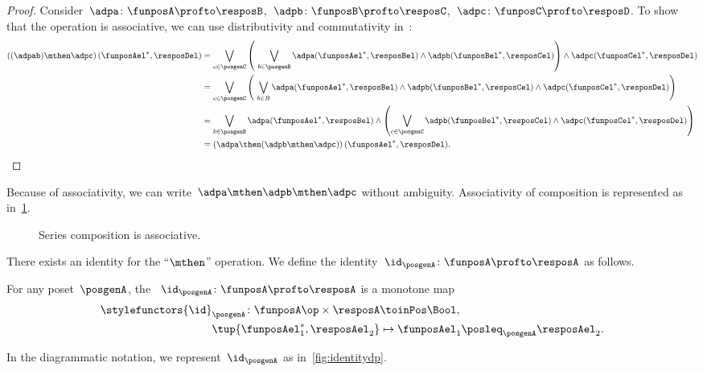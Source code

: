 \begin{proof}
  Consider~$\adpa\colon \funposA\profto \resposB$,~$\adpb\colon \funposB \profto \resposC$,~$\adpc\colon \funposC\profto \resposD$.
  To show that the operation is associative, we can use distributivity and commutativity in~\Bool:
%
  \begin{equation}
    \label{eq:dp_associativity}
    \begin{aligned}
      \left((\adpab) \mthen \adpc\right) (\funposAel^*,\resposDel)
      &= \bigvee_{c \in \posgenC} \left (\ \bigvee_{b\in \posgenB} \adpa(\funposAel^*,\resposBel) \wedge \adpb(\funposBel^*,\resposCel) \right )  \wedge  \adpc (\funposCel^*, \resposDel) \\
      &= \bigvee_{c \in \posgenC} \left (\ \bigvee_{b\in B } \adpa(\funposAel^*,\resposBel)
      \wedge \adpb(\funposBel^*,\resposCel) \wedge \adpc (\funposCel^*, \resposDel)
      \right ) \\
      &= \bigvee_{b \in \posgenB } \adpa(\funposAel^*,\resposBel) \wedge \left ( \bigvee_{c\in \posgenC} \adpb(\funposBel^*,\resposCel) \wedge \adpc (\funposCel^*, \resposDel) \right ) \\
      &= \left(\adpa \then (\adpb \mthen \adpc )\right) (\funposAel^*, \resposDel).
    \end{aligned}
  \end{equation}
%
\end{proof}

Because of associativity, we can write~$\adpa\mthen \adpb\mthen \adpc$ without ambiguity.
Associativity of composition is represented as in~\cref{fig:compositionassociativity}.

\begin{figure}[h!]
  \begin{center}
  \end{center}
  \caption{Series composition is associative. \label{fig:compositionassociativity}}
\end{figure}

There exists an identity for the ``$\mthen$'' operation.
We define the identity~$\id_\posgenA \colon \funposA \profto \resposA$ as follows.

\begin{definition}
  \label{def:dp-identity}
  For any poset~$\posgenA$, the \emph{}~$\id_\posgenA \colon \funposA \profto \resposA$ is a monotone map
  \begin{equation}
    \begin{aligned}
      \stylefunctors{\id}_\posgenA \colon \funposA\op \times \resposA & \toinPos   \Bool, \label{eq:identity}\\
      \tup{\funposAel_1^*, \resposAel_2} & \mapsto \funposAel_1 \posleq_{\posgenA} \resposAel_2.
    \end{aligned}
  \end{equation}
\end{definition}
In the diagrammatic notation, we represent~$\id_\posgenA$ as in~\cref{fig:identitydp}.

